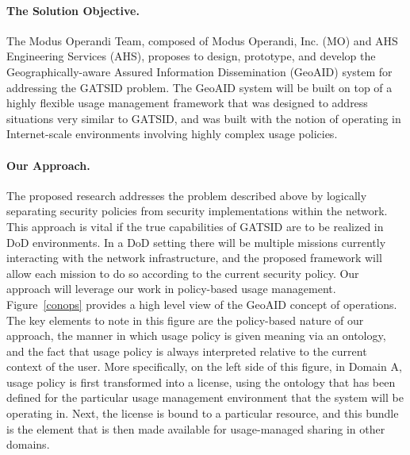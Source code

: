 \documentclass{sbir}
\begin{document}
\clearpage
{}

\paragraph{The Solution Objective.} The Modus Operandi Team, composed of Modus Operandi, Inc. (MO) and AHS Engineering Services (AHS), proposes to design, prototype, and develop the Geographically-aware Assured Information Dissemination (GeoAID) system for addressing the GATSID problem. The GeoAID system will be built on top of a highly flexible usage management framework that was designed to address situations very similar to GATSID, and was built with the notion of operating in Internet-scale environments involving highly complex usage policies.

\paragraph{Our Approach.} The proposed research addresses the problem described above by logically separating security policies from security implementations within the network. This approach is vital if the true capabilities of GATSID are to be realized in DoD environments. In a DoD setting there will be multiple missions currently interacting with the network infrastructure, and the proposed framework will allow each mission to do so according to the current security policy. Our approach will leverage our work in policy-based usage management. Figure~\ref{conops} provides a high level view of the GeoAID concept of operations. The key elements to note in this figure are the policy-based nature of our approach, the manner in which usage policy is given meaning via an ontology, and the fact that usage policy is always interpreted relative to the current context of the user. More specifically, on the left side of this figure, in Domain A, usage policy is first transformed into a license, using the ontology that has been defined for the particular usage management environment that the system will be operating in. Next, the license is bound to a particular resource, and this bundle is the element that is then made available for usage-managed sharing in other domains.
\end{document}
